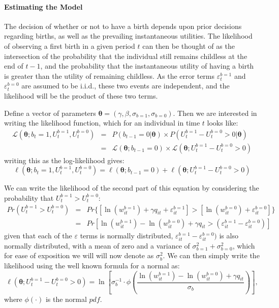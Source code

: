 \documentclass[a4paper, 11 pt]{article}
\theoremstyle{plain}
\begin{document}
\begin{spacing}{1.2}
\paragraph{Estimating the Model}
The decision of whether or not to have a birth depends upon prior decisions 
regarding births, as well as the prevailing instantaneous utilities.  The
likelihood of observing a first birth in a given period $t$ can then be thought 
of as the intersection of the probability that the individual still remains 
childless at the end of $t-1$, and the probability that the instantaneous 
utility of having a birth is greater than the utility of remaining childless. As 
the error terms $\varepsilon_t^{b=1}$ and $\varepsilon_t^{b=0}$ are assumed to 
be i.i.d., these two events are independent, and the likelihood will be the 
product of these two terms.

Define a vector of parameters $\bm\theta=(\gamma,\beta,\sigma_{b=1},
\sigma_{b=0})$. Then we are interested in writing the likelihood function, which 
for an individual in time $t$ looks like:
\begin{eqnarray}
\mathcal{L}(\bm\theta;b_t=1,U_t^{b=1},U_t^{b=0})&=&
P(b_{t-1}=0|\bm\theta) \times P(U_t^{b=1}-U_t^{b=0}>0|\bm\theta) \nonumber \\
& = & \mathcal{L}(\bm\theta;b_{t-1}=0)\times 
\mathcal{L}(\bm\theta;U_t^{b=1}-U_t^{b=0}>0) \nonumber
\end{eqnarray}
writing this as the log-likelihood gives:
\begin{equation}
\ell(\bm\theta;b_t=1,U_t^{b=1},U_t^{b=0})= \ell(\bm\theta;b_{t-1}=0) 
+ \ell(\bm\theta;U_t^{b=1}-U_t^{b=0}>0)
\end{equation}

We can write the likelihood of the second part of this equation by considering
the probability that $U_t^{b=1}>U_t^{b=0}$:
\begin{eqnarray}
\label{bqEqn:LL2}
Pr(U_t^{b=1}>U_t^{b=0})&=&Pr\{[\ln(w_{it}^{b=1}) + \gamma q_{it} + \varepsilon^{b=1}_{it}]
>[\ln(w_{it}^{b=0}) + \varepsilon^{b=0}_{it}]\} \nonumber \\
&=&Pr[\ln(w_{it}^{b=1})-\ln(w_{it}^{b=0})+ \gamma q_{it} > 
(\varepsilon^{b=1}_{it}-\varepsilon^{b=0}_{it})] 
\end{eqnarray}
given that each of the $\varepsilon$ terms is normally distributed, 
$\varepsilon^{b=1}_{it}-\varepsilon^{b=0}_{it})$ is also normally distributed,
with a mean of zero and a variance of $\sigma_{b=1}^2+\sigma_{b=0}^2$, which for
ease of exposition we will will now denote as $\sigma^2_b$.  We can then simply 
write the likelihood using the well known formula for a normal as:
\begin{equation}
\ell(\bm\theta;U_t^{b=1}-U_t^{b=0}>0) = \ln\left[\sigma_b^{-1}\cdot\phi
\left(\frac{\ln(w_{it}^{b=1})-\ln(w_{it}^{b=0})+ \gamma q_{it}}{\sigma_b}\right)\right],
\end{equation}
where $\phi(\cdot)$ is the normal $pdf$.


\end{spacing}
\end{document}
